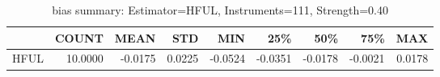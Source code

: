 \begin{table}[ht]
\centering
\caption{bias summary: Estimator=HFUL, Instruments=111, Strength=0.40}
\begin{tabular}{lrrrrrrrr}
\toprule
 & COUNT & MEAN & STD & MIN & 25\% & 50\% & 75\% & MAX \\
\midrule
HFUL & 10.0000 & -0.0175 & 0.0225 & -0.0524 & -0.0351 & -0.0178 & -0.0021 & 0.0178 \\
\bottomrule
\end{tabular}
\end{table}
